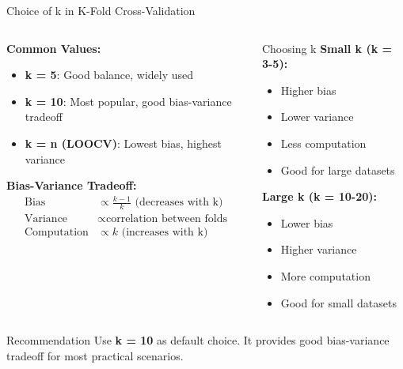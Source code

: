 \documentclass[8pt,aspectratio=1610]{beamer}
\begin{document}
\begin{frame}{Choice of k in K-Fold Cross-Validation}
\begin{columns}[t]
\begin{column}{0.58\textwidth}
\textbf{Common Values:}
\begin{itemize}
\setlength{\itemsep}{4pt}
\item \textbf{k = 5}: Good balance, widely used
\item \textbf{k = 10}: Most popular, good bias-variance tradeoff
\item \textbf{k = n (LOOCV)}: Lowest bias, highest variance
\end{itemize}

\vspace{0.3cm}

\textbf{Bias-Variance Tradeoff:}
\begin{align}
\text{Bias} &\propto \frac{k-1}{k} \text{ (decreases with k)} \\
\text{Variance} &\propto \text{correlation between folds} \\
\text{Computation} &\propto k \text{ (increases with k)}
\end{align}
\end{column}

\begin{column}{0.38\textwidth}
\begin{block}{Choosing k}
\textbf{Small k (k = 3-5):}
\begin{itemize}
\item Higher bias
\item Lower variance
\item Less computation
\item Good for large datasets
\end{itemize}

\vspace{0.2cm}

\textbf{Large k (k = 10-20):}
\begin{itemize}
\item Lower bias
\item Higher variance
\item More computation
\item Good for small datasets
\end{itemize}
\end{block}
\end{column}
\end{columns}

\begin{alertblock}{Recommendation}
Use \textbf{k = 10} as default choice. It provides good bias-variance tradeoff for most practical scenarios.
\end{alertblock}
\end{frame}
\end{document}
